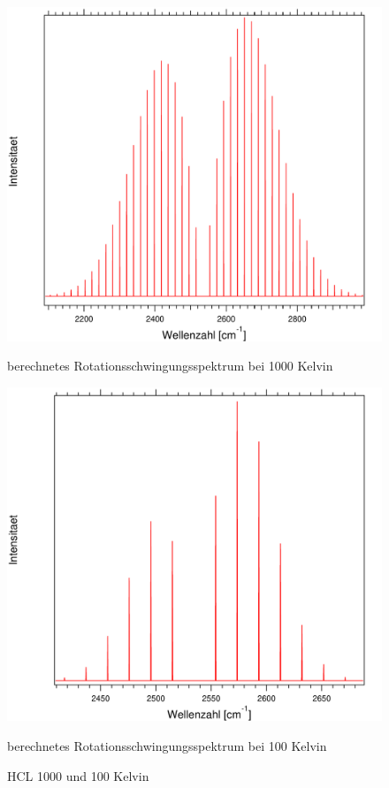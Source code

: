 \begin{figure}[H]
	
	\begin{minipage}{0.5\textwidth}
	\includegraphics[width=\textwidth]{Bilder/1000HCL.pdf}
	\caption{berechnetes Rotationsschwingungsspektrum bei 1000 Kelvin}
	\end{minipage}
\begin{minipage}{0.5\textwidth}
	\includegraphics[width=\textwidth]{Bilder/100HCL.pdf}
	\caption{berechnetes Rotationsschwingungsspektrum bei 100 Kelvin}
	\end{minipage}	
	
	\caption{HCL 1000 und 100 Kelvin}
	
	
\end{figure}

